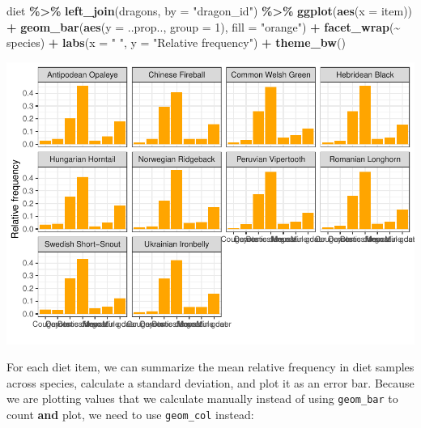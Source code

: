 \documentclass[
]{book}
\newenvironment{Shaded}{\begin{snugshade}}{\end{snugshade}}
\newcommand{\AttributeTok}[1]{\textcolor[rgb]{0.13,0.29,0.53}{#1}}
\newcommand{\DecValTok}[1]{\textcolor[rgb]{0.00,0.00,0.81}{#1}}
\newcommand{\FunctionTok}[1]{\textcolor[rgb]{0.13,0.29,0.53}{\textbf{#1}}}
\newcommand{\NormalTok}[1]{#1}
\newcommand{\SpecialCharTok}[1]{\textcolor[rgb]{0.81,0.36,0.00}{\textbf{#1}}}
\newcommand{\StringTok}[1]{\textcolor[rgb]{0.31,0.60,0.02}{#1}}
\begin{document}
\begin{Shaded}
\begin{Highlighting}[]
\NormalTok{diet }\SpecialCharTok{\%\textgreater{}\%} 
  \FunctionTok{left\_join}\NormalTok{(dragons, }\AttributeTok{by =} \StringTok{"dragon\_id"}\NormalTok{) }\SpecialCharTok{\%\textgreater{}\%} 
\FunctionTok{ggplot}\NormalTok{(}\FunctionTok{aes}\NormalTok{(}\AttributeTok{x =}\NormalTok{ item)) }\SpecialCharTok{+}
  \FunctionTok{geom\_bar}\NormalTok{(}\FunctionTok{aes}\NormalTok{(}\AttributeTok{y =}\NormalTok{ ..prop.., }\AttributeTok{group =} \DecValTok{1}\NormalTok{), }\AttributeTok{fill =} \StringTok{"orange"}\NormalTok{) }\SpecialCharTok{+} 
  \FunctionTok{facet\_wrap}\NormalTok{(}\SpecialCharTok{\textasciitilde{}}\NormalTok{ species) }\SpecialCharTok{+}
  \FunctionTok{labs}\NormalTok{(}\AttributeTok{x =} \StringTok{" "}\NormalTok{, }\AttributeTok{y =} \StringTok{"Relative frequency"}\NormalTok{) }\SpecialCharTok{+}
  \FunctionTok{theme\_bw}\NormalTok{()}
\end{Highlighting}
\end{Shaded}

\includegraphics{reproducible-science_files/figure-latex/gg26-1.pdf}

For each diet item, we can summarize the mean relative frequency in diet samples
across species, calculate a standard deviation, and plot it as an error bar.
Because we are plotting values that we calculate manually instead of using
\texttt{geom\_bar} to count \textbf{and} plot, we need to use \texttt{geom\_col} instead:
\end{document}
